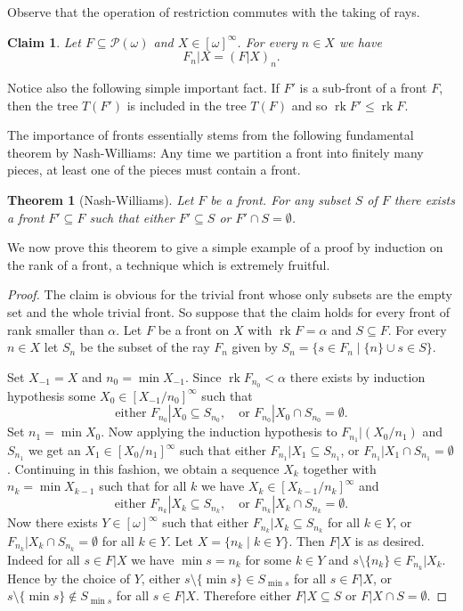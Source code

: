 \documentclass{article}%
\theoremstyle{plain}
\newtheorem{theorem}{Theorem}
\newtheorem{theorem}{Theorem}[section]
\newtheorem{lemma}[theorem]{Properties}
\newtheorem{lemma}[theorem]{Lemma}
\newtheorem{lemma}[theorem]{Fact}
\newtheorem{lemma}[theorem]{Facts}
\newtheorem{lemma}{Claim}
\theoremstyle{definition}
\theoremstyle{remark}
\DeclareMathOperator{\rk}{rk}
\newcommand{\infSub}[1]{[#1]^{\infty}}
\begin{document}
Observe that the operation of restriction commutes with the taking of rays.

\begin{lemma}
Let $F\subseteq \mathcal{P}(\omega)$ and $X\in\infSub{\omega}$. For every $n\in X$ we have \[F_{n}|X=(F|X)_{n}.\]
\end{lemma}


Notice also the following simple important fact. If $F'$ is a sub-front of a front $F$, then the tree $T(F')$ is included in the tree $T(F)$ and so $\rk F'\leq \rk F$.

The importance of fronts essentially stems from the following fundamental theorem by Nash-Williams: Any time we partition a front into finitely many pieces, at least one of the pieces must contain a front.

\begin{theorem}[Nash-Williams]\label{cor:NashWill}
Let $F$ be a front. For any subset $S$ of $F$ there exists a front $F'\subseteq F$  such that either $F'\subseteq S$ or $F'\cap S=\emptyset$.
\end{theorem}

We now prove this theorem to give a simple example of a proof by induction on the rank of a front, a technique which is extremely fruitful.

\begin{proof}
The claim is obvious for the trivial front whose only subsets are the empty set and the whole trivial front. So suppose that the claim holds for every front of rank smaller than $\alpha$. Let $F$ be a front on $X$ with $\rk F=\alpha$ and $S\subseteq F$. For every $n\in X$ let $S_{n}$ be the subset of the ray $F_{n}$ given by $S_{n}=\{s\in F_{n}\mid \{n\} \cup s\in S\}$. 

Set $X_{-1}=X$ and $n_{0}=\min X_{-1}$. Since $\rk F_{n_{0}}<\alpha$ there exists by induction hypothesis some $X_{0}\in\infSub{X_{-1}/n_{0}}$ such that 
\[
\text{either }F_{n_{0}}|X_{0}\subseteq S_{n_{0}}, \quad\text{or }F_{n_{0}}|X_{0}\cap S_{n_{0}}=\emptyset.
\] 
Set $n_{1}=\min X_{0}$. Now applying the induction hypothesis to $F_{n_{1}}|(X_{0}/n_{1})$ and $S_{n_{1}}$ we get an $X_{1}\in \infSub{X_{0}/n_{1}}$ such that either $F_{n_{1}}|X_{1}\subseteq S_{n_{1}}$, or $F_{n_{1}}|X_{1}\cap S_{n_{1}}=\emptyset$. Continuing in this fashion, we obtain a sequence $X_{k}$ together with $n_{k}=\min X_{k-1}$ such that for all $k$ we have $X_{k}\in \infSub{X_{k-1}/n_{k}}$ and
\[
\text{either }F_{n_{k}}|X_{k}\subseteq S_{n_{k}}, \quad\text{or }F_{n_{k}}|X_{k}\cap S_{n_{k}}=\emptyset.
\]
Now there exists $Y\in \infSub{\omega}$ such that either $F_{n_{k}}|X_{k}\subseteq S_{n_{k}}$ for all $k\in Y$, or $F_{n_{k}}|X_{k}\cap S_{n_{k}}=\emptyset$ for all $k\in Y$. Let $X=\{n_{k}\mid k\in Y\}$. Then $F|X$ is as desired. Indeed for all $s\in F|X$ we have $\min s=n_{k}$ for some $k\in Y$ and $s\setminus \{n_{k}\}\in F_{n_{k}}|X_{k}$. Hence by the choice of $Y$, either $s\setminus\{\min s\}\in S_{\min s}$ for all $s\in F|X$, or $s\setminus \{\min s\}\notin S_{\min s}$ for all $s\in F|X$.  Therefore either $F|X\subseteq S$ or $F|X\cap S=\emptyset$.
\end{proof}
\end{document}
